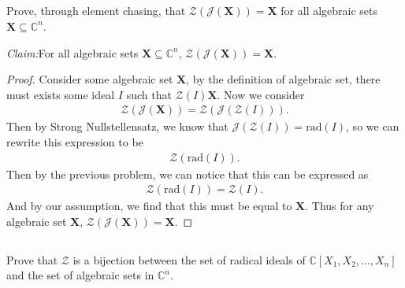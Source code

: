 \documentclass[10pt]{amsart}
\newcommand{\C}{\mathbb{C}}
\newcommand{\rad}[1]{\text{rad}\left(#1\right)}
\newenvironment{claim}[1]{\par\noindent\textit{Claim:}\space#1}{}
\begin{document}
\subsection{}%
\label{sub:4c}

Prove, through element chasing, that
$\mathscr{Z}(\mathscr{J}(\mathbf{X}))=\mathbf{X}$ for all algebraic sets
$\mathbf{X}\subseteq\C^n$.

\begin{claim}
  For all algebraic sets $\mathbf{X}\subseteq\C^n$,
  $\mathscr{Z}(\mathscr{J}(\mathbf{X}))=\mathbf{X}$.
\end{claim}
\begin{proof}
  Consider some algebraic set $\mathbf{X}$, by the definition of algebraic set,
  there must exists some ideal $I$ such that $\mathscr{Z}(I)\mathbf{X}$. Now we
  consider
  \begin{align*}
    \mathscr{Z}(\mathscr{J}(\mathbf{X}))=\mathscr{Z}(\mathscr{J}(\mathscr{Z}(I))).
  \end{align*}
  Then by Strong Nullstellensatz, we know that
  $\mathscr{J}(\mathscr{Z}(I))=\rad{I}$, so we can rewrite this expression to
  be
  \begin{align*}
    \mathscr{Z}(\rad{I}).
  \end{align*}
  Then by the previous problem, we can notice that this can be expressed as
  \begin{align*}
    \mathscr{Z}(\rad{I})=\mathscr{Z}(I).
  \end{align*}
  And by our assumption, we find that this must be equal to $\mathbf{X}$. Thus
  for any algebraic set $\mathbf{X}$,
  $\mathscr{Z}(\mathscr{J}(\mathbf{X}))=\mathbf{X}$.
\end{proof}

\subsection{}%
\label{sub:4d}

Prove that $\mathscr{Z}$ is a bijection between the set of radical ideals of
$\C[X_1,X_2,\ldots,X_n]$ and the set of algebraic sets in $\C^n$.
\end{document}
